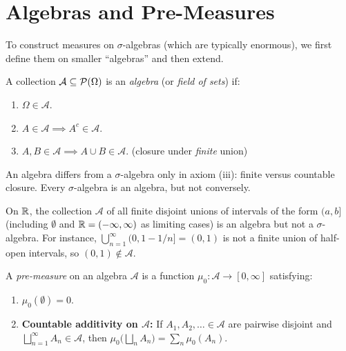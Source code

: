 \documentclass[11pt,a4paper]{article}
\begin{document}

\section{Algebras and Pre-Measures}
\label{sec:algebras}

To construct measures on $\sigma$-algebras (which are typically
enormous), we first define them on smaller ``algebras'' and then extend.

\begin{definition}
\label{def:algebra}
A collection $\mathcal{A} \subseteq \mathcal{P}(\Omega)$ is an
\emph{algebra} (or \emph{field of sets}) if:
\begin{enumerate}[nosep,label=(\roman*)]
  \item $\Omega \in \mathcal{A}$.
  \item $A \in \mathcal{A} \implies A^c \in \mathcal{A}$.
  \item $A, B \in \mathcal{A} \implies A \cup B \in \mathcal{A}$.
    \hfill(closure under \emph{finite} union)
\end{enumerate}
\end{definition}

\begin{remark}
An algebra differs from a $\sigma$-algebra only in axiom (iii): finite
versus countable closure. Every $\sigma$-algebra is an algebra, but
not conversely.
\end{remark}

\begin{example}
\label{ex:algebra_intervals}
On $\mathbb{R}$, the collection $\mathcal{A}$ of all finite disjoint unions
of intervals of the form $(a, b]$ (including $\emptyset$ and
$\mathbb{R} = (-\infty, \infty)$ as limiting cases) is an algebra but not a
$\sigma$-algebra. For instance,
$\bigcup_{n=1}^\infty (0, 1 - 1/n] = (0, 1)$ is not a finite union
of half-open intervals, so $(0, 1) \notin \mathcal{A}$.
\end{example}

\begin{definition}
\label{def:premeasure}
A \emph{pre-measure} on an algebra $\mathcal{A}$ is a function
$\mu_0\colon \mathcal{A} \to [0, \infty]$ satisfying:
\begin{enumerate}[nosep,label=(\roman*)]
  \item $\mu_0(\emptyset) = 0$.
  \item \textbf{Countable additivity on $\mathcal{A}$:} If
    $A_1, A_2, \ldots \in \mathcal{A}$ are pairwise disjoint and
    $\bigsqcup_{n=1}^\infty A_n \in \mathcal{A}$, then
    $\mu_0\bigl(\bigsqcup_n A_n\bigr) = \sum_n \mu_0(A_n)$.
\end{enumerate}
\end{definition}
\end{document}
